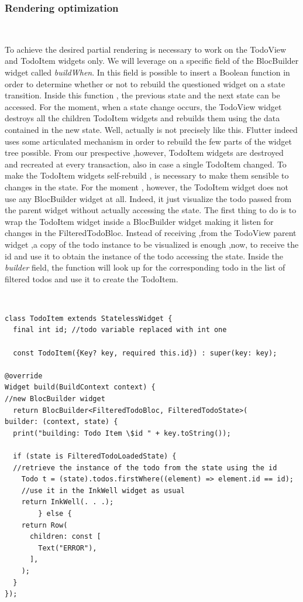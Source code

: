 \subsubsection{Rendering optimization} \mbox{}\\ \label{par:todo_app_inherited_widget_introduction}

To achieve the desired partial rendering is necessary to work on the TodoView and TodoItem widgets only. We will leverage on a specific field of the BlocBuilder widget called \textit{buildWhen}. In this field is possible to insert a Boolean function in order to determine whether or not to rebuild the questioned widget on a state transition. Inside this function , the previous state and the next state can be accessed. For the moment, when a state change occurs, the TodoView widget destroys all the children TodoItem widgets and rebuilds them using the data contained in the new state. Well, actually is not precisely like this. Flutter indeed uses some articulated mechanism in order to rebuild the few parts of the widget tree possible. From our prespective ,however, TodoItem widgets are destroyed and recreated at every transaction, also in case a single TodoItem changed. To make the TodoItem widgets self-rebuild , is necessary to make them sensible to changes in the state. For the moment , however, the TodoItem widget does not use any BlocBuilder widget at all. Indeed, it just visualize the todo passed from the parent widget without actually accessing the state. The first thing to do  is to wrap the TodoItem widget inside a BlocBuilder widget making it listen for changes in the FilteredTodoBloc. Instead of receiving ,from the TodoView parent widget ,a copy of the todo instance to be visualized is enough ,now, to receive the id and use it to obtain the instance of the todo accessing the state. Inside the \textit{builder} field, the function will look up for the corresponding todo in the list of filtered todos and use it to create the TodoItem. 
\begin{code}
\mbox{}\\
 \mbox{}
\label{code:2.14}
\begin{verbatim}
class TodoItem extends StatelessWidget {
  final int id; //todo variable replaced with int one

  const TodoItem({Key? key, required this.id}) : super(key: key);

@override
Widget build(BuildContext context) {
//new BlocBuilder widget
  return BlocBuilder<FilteredTodoBloc, FilteredTodoState>(
builder: (context, state) {
  print("building: Todo Item \$id " + key.toString());

  if (state is FilteredTodoLoadedState) {
  //retrieve the instance of the todo from the state using the id
    Todo t = (state).todos.firstWhere((element) => element.id == id);
    //use it in the InkWell widget as usual
    return InkWell(. . .);
        } else {
    return Row(
      children: const [
        Text("ERROR"),
      ],
    );
  }
});
\end{verbatim}
\mbox{}
\end{code}

